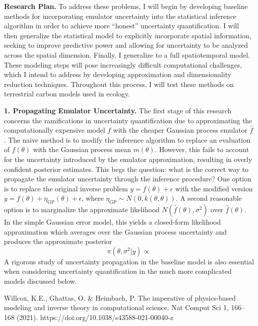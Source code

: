 \documentclass[12pt]{article}
\begin{document}
\noindent
\textbf{Research Plan.} To address these problems, I will begin by developing baseline methods for incorporating emulator uncertainty into the statistical inference algorithm in order to achieve more ``honest''
uncertainty quantification. I will then generalize the statistical model to explicitly incorporate spatial information, seeking to improve predictive power and allowing for uncertainty to be analyzed across
the spatial dimension. Finally, I generalize to a full spatiotemporal model. These modeling steps will pose increasingly difficult computational challenges, which I intend to address by developing 
approximation and dimensionality reduction techniques. Throughout this process, I will test these methods on terrestrial carbon models used in ecology. 
 
 \textbf{1. Propagating Emulator Uncertainty.} The first stage of this research concerns the ramifications in uncertainty quantification due to approximating the computationally expensive model $f$ with the 
 cheaper Gaussian process emulator $\hat{f}$. The naive method is to modify the inference algorithm to replace an evaluation of $f(\theta)$ with the Gaussian process mean $m(\theta)$. However, this fails to account
 for the uncertainty introduced by the emulator approximation, resulting in overly confident posterior estimates. This begs the question: what is the correct way to propagate the emulator uncertainty through 
 the inference procedure? One option is to replace the original inverse problem $y = f(\theta) + \epsilon$ with the modified version $y = f(\theta) + \eta_{\text{GP}}(\theta) + \epsilon$, 
 where $\eta_{\text{GP}} \sim N(0, k(\theta, \theta))$. A second reasonable option is to marginalize the approximate likelihood $N(\hat{f}(\theta), \sigma^2)$ over $\hat{f}(\theta)$. In the simple Gaussian error
 model, this yields a closed-form likelihood approximation which averages over the Gaussian process uncertainty and produces the approximate posterior
 \[\pi(\theta, \sigma^2|y) \propto \]
 A rigorous study of uncertainty propagation in the baseline model is also essential when considering uncertainty quantification in the much more complicated models discussed below. 
 
 



\begin{thebibliography}{20}
 Willcox, K.E., Ghattas, O. \& Heimbach, P. The imperative of physics-based modeling and inverse theory in computational science. Nat Comput Sci 1, 166–168 (2021). https://doi.org/10.1038/s43588-021-00040-z
\end{thebibliography}
\end{document}
